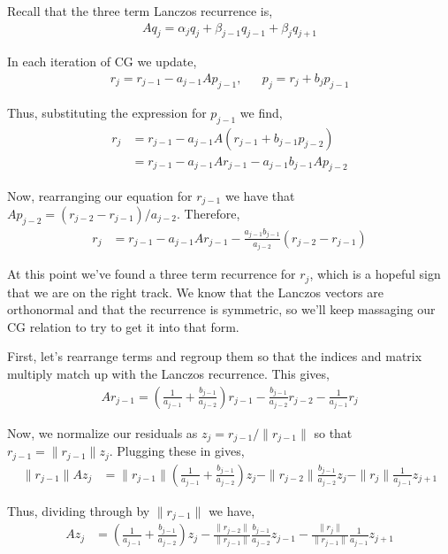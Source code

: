 Recall that the three term Lanczos recurrence is, \begin{align*}
Aq_j = \alpha_j q_j + \beta_{j-1}q_{j-1} + \beta_j q_{j+1}
\end{align*}

In each iteration of CG we update, \begin{align*}
r_j = r_{j-1} - a_{j-1} Ap_{j-1}
,&&
p_j = r_j + b_j p_{j-1}
\end{align*}

Thus, substituting the expression for \(p_{j-1}\) we find,
\begin{align*}
r_j &= r_{j-1} - a_{j-1} A(r_{j-1} + b_{j-1} p_{j-2})
\\&= r_{j-1} - a_{j-1} Ar_{j-1} - a_{j-1}b_{j-1} A p_{j-2}
\end{align*}

Now, rearranging our equation for \(r_{j-1}\) we have that
\(Ap_{j-2} = (r_{j-2} - r_{j-1}) / a_{j-2}\). Therefore, \begin{align*}
    r_j &= r_{j-1} - a_{j-1} Ar_{j-1} - \frac{a_{j-1}b_{j-1}}{a_{j-2}}(r_{j-2} - r_{j-1})
\end{align*}

At this point we've found a three term recurrence for \(r_j\), which is
a hopeful sign that we are on the right track. We know that the Lanczos
vectors are orthonormal and that the recurrence is symmetric, so we'll
keep massaging our CG relation to try to get it into that form.

First, let's rearrange terms and regroup them so that the indices and
matrix multiply match up with the Lanczos recurrence. This gives,
\begin{align*}
    Ar_{j-1} = \left(\frac{1}{a_{j-1}}+\frac{b_{j-1}}{a_{j-2}}\right) r_{j-1} - \frac{b_{j-1}}{a_{j-2}} r_{j-2} - \frac{1}{a_{j-1}} r_{j}
\end{align*}

Now, we normalize our residuals as \(z_j = r_{j-1}/\|r_{j-1}\|\) so that
\(r_{j-1} = \|r_{j-1}\| z_j\). Plugging these in gives, \begin{align*}
    \|r_{j-1}\|Az_{j} &= \|r_{j-1}\|\left(\frac{1}{a_{j-1}}+\frac{b_{j-1}}{a_{j-2}}\right) z_{j} 
    -\|r_{j-2}\|\frac{b_{j-1}}{a_{j-2}} z_{j} - \|r_j\| \frac{1}{a_{j-1}} z_{j+1}
\end{align*}

Thus, dividing through by \(\|r_{j-1}\|\) we have, \begin{align*}
    Az_{j} &= \left(\frac{1}{a_{j-1}}+\frac{b_{j-1}}{a_{j-2}}\right) z_{j} 
    - \frac{\|r_{j-2}\|}{\|r_{j-1}\|}\frac{b_{j-1}}{a_{j-2}} z_{j-1} - \frac{\|r_j\|}{\|r_{j-1}\|} \frac{1}{a_{j-1}} z_{j+1}
\end{align*}

